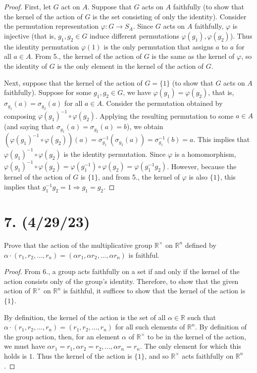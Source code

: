 \documentclass{article}
\begin{document}
\begin{proof}
    First, let $G$ act on $A$. Suppose that $G$ acts on $A$ faithfully (to show that the kernel of the action of $G$ is the set consisting of only the identity). Consider the permutation representation $\varphi: G \rightarrow S_A$. Since $G$ acts on $A$ faithfully, $\varphi$ is injective (that is, $g_1, g_2 \in G$ induce different permutations $\varphi(g_1), \varphi(g_2)$). Thus the identity permutation $\varphi(1)$ is the only permutation that assigns $a$ to $a$ for all $a \in A$. From 5., the kernel of the action of $G$ is the same as the kernel of $\varphi$, so the identity of $G$ is the only element in the kernel of the action of $G$.

    Next, suppose that the kernel of the action of $G = \{ 1 \}$ (to show that $G$ acts on $A$ faithfully). Suppose for some $g_1, g_2 \in G$, we have $\varphi(g_1) = \varphi(g_2)$, that is, $\sigma_{g_1}(a) = \sigma_{g_2}(a)$ for all $a \in A$. Consider the permutation obtained by composing $\varphi(g_1)^{-1} \circ \varphi(g_2)$. Applying the resulting permutation to some $a \in A$ (and saying that $\sigma_{g_1}(a) = \sigma_{g_2}(a) = b$), we obtain $(\varphi(g_1)^{-1} \circ \varphi(g_2))(a) = \sigma_{g_1}^{-1}(\sigma_{g_2}(a)) = \sigma_{g_1}^{-1}(b) = a$. This implies that $\varphi(g_1)^{-1} \circ \varphi(g_2)$ is the identity permutation. Since $\varphi$ is a homomorphism, $\varphi(g_1)^{-1} \circ \varphi(g_2) = \varphi(g_1^{-1}) \circ \varphi(g_2) = \varphi(g_1^{-1} g_2)$. However, because the kernel of the action of $G$ is $\{ 1 \}$, and from 5., the kernel of $\varphi$ is also $\{ 1 \}$, this implies that $g_1^{-1} g_2 = 1 \Rightarrow g_1 = g_2$.
\end{proof}

\section*{7. (4/29/23)}

Prove that the action of the multiplicative group $\mathbb{R}^\times$ on $\mathbb{R}^n$ defined by \\ $\alpha \cdot (r_1, r_2, ..., r_n) = (\alpha r_1, \alpha r_2, ..., \alpha r_n)$ is faithful.

\begin{proof}
    From 6., a group acts faithfully on a set if and only if the kernel of the action consists only of the group's identity. Therefore, to show that the given action of $\mathbb{R}^\times$ on $\mathbb{R}^n$ is faithful, it suffices to show that the kernel of the action is $\{ 1 \}$.

    By definition, the kernel of the action is the set of all $\alpha \in \mathbb{R}$ such that $\alpha \cdot (r_1, r_2, ..., r_n) = (r_1, r_2, ..., r_n)$ for all such elements of $\mathbb{R}^n$. By definition of the group action, then, for an element $\alpha$ of $\mathbb{R}^\times$ to be in the kernel of the action, we must have $\alpha r_1 = r_1, \alpha r_2 = r_2, ..., \alpha r_n = r_n$. The only element for which this holds is $1$. Thus the kernel of the action is $\{ 1 \}$, and so $\mathbb{R}^\times$ acts faithfully on $\mathbb{R}^n$.
\end{proof}
\end{document}
